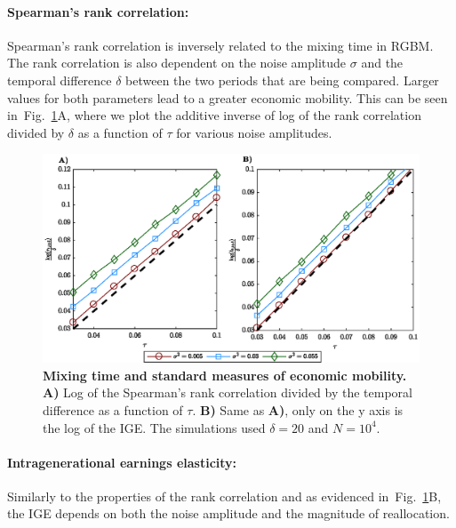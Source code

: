\documentclass[11pt]{article}
\newcommand{\fref}[1]{Fig.~\ref{fig:#1}}
\numberwithin{equation}{section}
\begin{document}
\paragraph{Spearman's rank correlation:} Spearman's rank correlation is inversely related to the mixing time in RGBM. The rank correlation is also dependent on the noise amplitude $\sigma$ and the temporal difference $\delta$ between the two periods that are being compared. Larger values for both parameters lead to a greater economic mobility. This can be seen in~\fref{rgbm-standard-measures}A, where we plot the additive inverse of log of the rank correlation divided by $\delta$ as a function of $\tau$ for various noise amplitudes.

\begin{figure}[!htb]
\centering
\includegraphics[width=1.0\textwidth]{figs/fig_rgbm_standard_measures.eps}
\caption{\textbf{Mixing time and standard measures of economic mobility.} \textbf{A)} Log of the Spearman's rank correlation divided by the temporal difference as a function of $\tau$. \textbf{B)} Same as \textbf{A)}, only on the y axis is the log of the IGE. The simulations used $\delta = 20$ and $N = 10^4$.
\label{fig:rgbm-standard-measures}}
\end{figure}

\paragraph{Intragenerational earnings elasticity:} Similarly to the properties of the rank correlation and as evidenced in~\fref{rgbm-standard-measures}B, the IGE depends on both the noise amplitude and the magnitude of reallocation.
\end{document}
